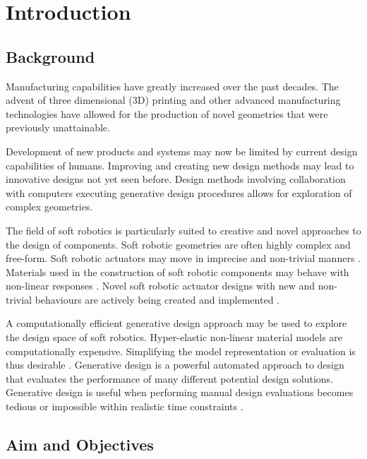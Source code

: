 \chapter{Introduction}
\label{chp:I}


\section{Background}

Manufacturing capabilities have greatly increased over the past decades. The advent of three dimensional (3D) printing and other advanced manufacturing technologies have allowed for the production of novel geometries that were previously unattainable. \citep{Buchanan2019,Luis2020}

Development of new products and systems may now be limited by current design capabilities of humans. Improving and creating new design methods may lead to innovative designs not yet seen before. Design methods involving collaboration with computers executing generative design procedures allows for exploration of complex geometries. \citep{Shea2005}

The field of soft robotics is particularly suited to creative and novel approaches to the design of components. Soft robotic geometries are often highly complex and free-form. Soft robotic actuators may move in imprecise and non-trivial manners \citep{Whitesides2018}. Materials used in the construction of soft robotic components may behave with non-linear responses \citep{Boyraz2018}. Novel soft robotic actuator designs with new and non-trivial behaviours are actively being created and implemented \citep{Ellis2020}.

A computationally efficient generative design approach may be used to explore the design space of soft robotics. Hyper-elastic non-linear material models are computationally expensive. Simplifying the model representation or evaluation is thus desirable \citep{Niroomandi2010}. Generative design is a powerful automated approach to design that evaluates the performance of many different potential design solutions. Generative design is useful when performing manual design evaluations becomes tedious or impossible within realistic time constraints \citep{Brose1993}.

\section{Aim and Objectives}

